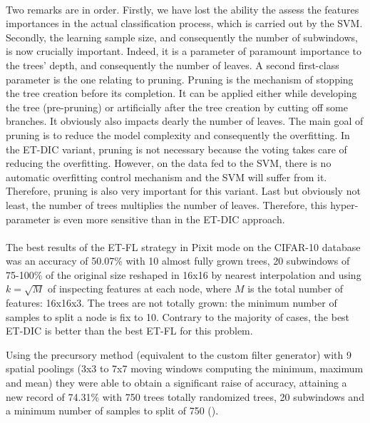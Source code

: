 \documentclass[a4paper]{report}
\begin{document}
		\paragraph{}
		Two remarks are in order. Firstly, we have lost the ability the assess the features importances in the actual classification process, which is carried out by the SVM.
		Secondly,	the learning sample size, and consequently the number of subwindows, is now crucially important. Indeed, it is a parameter of paramount importance to the trees' depth, and consequently the number of leaves. 
		A second first-class parameter is the one relating to pruning. Pruning is the mechanism of stopping the tree creation before its completion. It can be applied either while developing the tree (pre-pruning) or artificially after the tree creation by cutting off some branches. It obviously also impacts dearly the number of leaves. The main goal of pruning is to reduce the model complexity and consequently the overfitting. In the ET-DIC variant, pruning is not necessary because the voting takes care of reducing the overfitting. However, on the data fed to the SVM, there is no automatic overfitting control mechanism and the SVM will suffer from it. Therefore, pruning is also very important for this variant.
		Last but obviously not least, the number of trees multiplies the number of leaves. Therefore, this hyper-parameter is even more sensitive than in the ET-DIC approach.
		
		\paragraph{}
		The best results of the ET-FL strategy in Pixit mode on the CIFAR-10 database was an accuracy of 50.07\% with 10 almost fully grown trees, 20 subwindows of 75-100\% of the original size reshaped in 16x16 by nearest interpolation and using $k = \sqrt{M}$ of inspecting features at each node, where $M$ is the total number of features: 16x16x3. The trees are not totally grown: the minimum number of samples to split a node is fix to 10. Contrary to the majority of cases, the best ET-DIC is better than the best ET-FL for this problem.
	\par
	Using the precursory method (equivalent to the custom filter generator) with 9 spatial poolings (3x3 to 7x7 moving windows computing the minimum, maximum and mean) they were able to obtain a significant raise of accuracy, attaining a new record of 74.31\% with 750 trees totally randomized trees, 20 subwindows and a minimum number of samples to split of 750 (\cite{base}).
			
\end{document}
